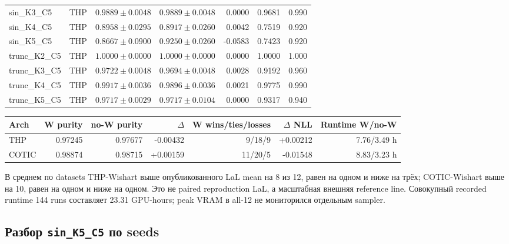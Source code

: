 \documentclass[11pt,a4paper]{article}
\newcommand{\code}[1]{\texttt{#1}}
\begin{document}
\begin{landscape}
\begin{longtable}{llrrrrr}
sin\_K3\_C5 & THP & $0.9889\pm0.0048$ & $0.9889\pm0.0048$ & 0.0000 & 0.9681 & 0.990 \\
sin\_K4\_C5 & THP & $0.8958\pm0.0295$ & $0.8917\pm0.0260$ & 0.0042 & 0.7519 & 0.920 \\
sin\_K5\_C5 & THP & $0.8667\pm0.0900$ & $0.9250\pm0.0260$ & -0.0583 & 0.7423 & 0.920 \\
trunc\_K2\_C5 & THP & $1.0000\pm0.0000$ & $1.0000\pm0.0000$ & 0.0000 & 1.0000 & 1.000 \\
trunc\_K3\_C5 & THP & $0.9722\pm0.0048$ & $0.9694\pm0.0048$ & 0.0028 & 0.9192 & 0.960 \\
trunc\_K4\_C5 & THP & $0.9917\pm0.0036$ & $0.9896\pm0.0036$ & 0.0021 & 0.9775 & 0.990 \\
trunc\_K5\_C5 & THP & $0.9717\pm0.0029$ & $0.9717\pm0.0104$ & 0.0000 & 0.9317 & 0.940 \\
\bottomrule
\end{longtable}
\end{landscape}

\begin{center}
\begin{tabular}{lrrrrrr}
\toprule
Arch & W purity & no-W purity & $\Delta$ & W wins/ties/losses & $\Delta$ NLL & Runtime W/no-W \\
\midrule
THP & 0.97245 & 0.97677 & -0.00432 & 9/18/9 & +0.00212 & 7.76/3.49 h \\
COTIC & 0.98874 & 0.98715 & +0.00159 & 11/20/5 & -0.01548 & 8.83/3.23 h \\
\bottomrule
\end{tabular}
\end{center}

В среднем по datasets THP-Wishart выше опубликованного LaL mean на 8 из 12,
равен на одном и ниже на трёх; COTIC-Wishart выше на 10, равен на одном и ниже
на одном. Это не paired reproduction LaL, а масштабная внешняя reference line.
Совокупный recorded runtime 144 runs составляет 23.31 GPU-hours; peak VRAM в
all-12 не мониторился отдельным sampler.

\subsection{Разбор \code{sin\_K5\_C5} по seeds}
\end{document}
